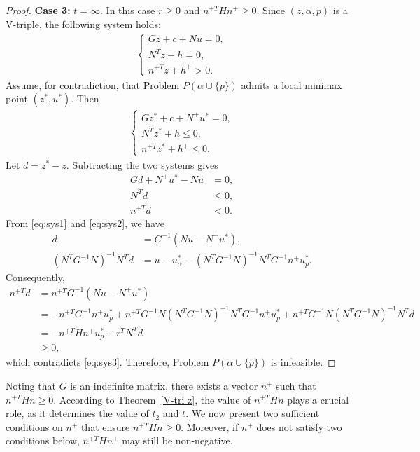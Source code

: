 \documentclass{article}
\begin{document}
\begin{proof}
		\noindent\textbf{Case 3:} $t = \infty$.  
		In this case $r \ge 0$ and $n^{+T}Hn^{+} \ge 0$.  
		Since $(z, \alpha, p)$ is a V-triple, the following system holds:
		\begin{align*}
		\begin{cases}
			Gz + c + N u = 0,\\
			N^{T}z + h = 0,\\
			n^{+T}z + h^{+} > 0.
		\end{cases}
		\end{align*}
		Assume, for contradiction, that Problem $P(\alpha \cup \{p\})$ admits a local minimax point $(z^{\ast}, u^{\ast})$.  
		Then
		\begin{align*}
		\begin{cases}
			Gz^{\ast} + c + N^{+}u^{\ast} = 0,\\
			N^{T}z^{\ast} + h \le 0,\\
			n^{+T}z^{\ast} + h^{+} \le 0.
		\end{cases}
		\end{align*}
		Let $d = z^{\ast} - z$.  
		Subtracting the two systems gives
		\begin{align}
			Gd + N^{+}u^{\ast} - N u &= 0, \label{eq:sys1}\\
			N^{T}d &\le 0, \label{eq:sys2}\\
			n^{+T}d &< 0. \label{eq:sys3}
		\end{align}
		From \eqref{eq:sys1} and \eqref{eq:sys2}, we have
		\begin{align*}
			d &= G^{-1}(N u - N^{+}u^{\ast}),\\
			(N^{T}G^{-1}N)^{-1}N^{T}d
			&= u - u_{\alpha}^{\ast} - (N^{T}G^{-1}N)^{-1}N^{T}G^{-1}n^{+}u_{p}^{\ast}.
		\end{align*}
		Consequently,
		\begin{align*}
			n^{+T}d
			&= n^{+T}G^{-1}(N u - N^{+}u^{\ast})\\
			&= -n^{+T}G^{-1}n^{+}u_{p}^{\ast}
			+ n^{+T}G^{-1}N(N^{T}G^{-1}N)^{-1}N^{T}G^{-1}n^{+}u_{p}^{\ast}
			+ n^{+T}G^{-1}N(N^{T}G^{-1}N)^{-1}N^{T}d\\
			&= -n^{+T}Hn^{+}u_{p}^{\ast} - r^{T}N^{T}d\\
			&\geq 0,
		\end{align*}
		which contradicts \eqref{eq:sys3}.  
		Therefore, Problem $P(\alpha \cup \{p\})$ is infeasible.
	\end{proof}
	
	Noting that $G$ is an indefinite matrix, there exists a vector $n^{+}$ such that $n^{+T}Hn \geq 0$. According to Theorem~\ref{V-tri z}, the value of $n^{+T}Hn$ plays a crucial role, as it determines the value of $t_{2}$ and $t$. We now present two sufficient conditions on $n^{+}$ that ensure $n^{+T}Hn \geq 0$. Moreover, if $n^{+}$ does not satisfy two conditions below, $n^{+T}Hn^{+}$ may still be non-negative.
	
\end{document}
